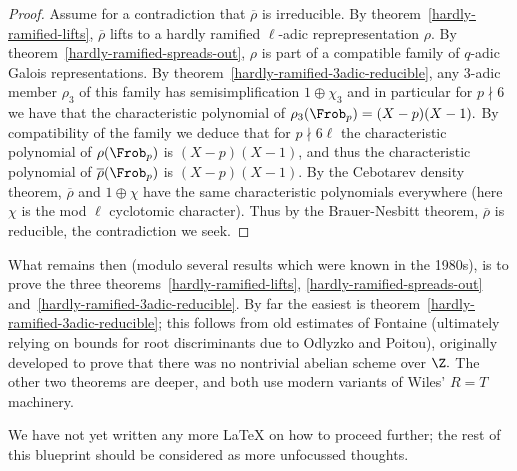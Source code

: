 \begin{proof}
  Assume for a contradiction that $\overline{\rho}$ is irreducible. By theorem~\ref{hardly-ramified-lifts},
  $\overline{\rho}$ lifts to a hardly ramified $\ell$-adic reprepresentation $\rho$. By
  theorem~\ref{hardly-ramified-spreads-out}, $\rho$ is part of a compatible family of
  $q$-adic Galois representations. By theorem~\ref{hardly-ramified-3adic-reducible},
  any 3-adic member $\rho_3$ of this family has semisimplification $1\oplus\chi_3$ and in particular
  for $p\nmid 6$ we have that the characteristic polynomial of $\rho_3(\Frob_p)=(X-p)(X-1).$
  By compatibility of the family we deduce that for $p\nmid 6\ell$ the characteristic
  polynomial of $\rho(\Frob_p)$ is $(X-p)(X-1)$, and thus the characteristic polynomial
  of $\overline{\rho}(\Frob_p)$ is $(X-p)(X-1)$. By the Cebotarev density theorem,
  $\overline{\rho}$ and $1\oplus\chi$ have the same characteristic polynomials everywhere
  (here $\chi$ is the mod $\ell$ cyclotomic character). Thus by the Brauer-Nesbitt theorem,
  $\overline{\rho}$ is reducible, the contradiction we seek.
\end{proof}

What remains then (modulo several results which were known in the 1980s),
is to prove the three theorems~\ref{hardly-ramified-lifts},
\ref{hardly-ramified-spreads-out} and~\ref{hardly-ramified-3adic-reducible}.
By far the easiest is theorem~\ref{hardly-ramified-3adic-reducible}; this follows
from old estimates of Fontaine (ultimately relying on bounds for root discriminants due to
Odlyzko and Poitou), originally developed to prove that there was no
nontrivial abelian scheme over $\Z.$ The other two theorems are deeper, and both use
modern variants of Wiles' $R=T$ machinery.

We have not yet written any more LaTeX on how to proceed further; the rest of
this blueprint should be considered as more unfocussed thoughts.
